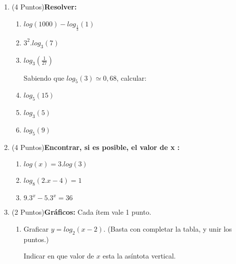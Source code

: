 \documentclass[a4paper,11pt,spanish,sans]{exam}
\begin{document}
\begin{enumerate}
\item (4 Puntos)\textbf{Resolver:} 
\begin{multicols}{2}
\begin{enumerate}
\item $log(1000)-log_{\frac{1}{3}}(1)$
\item $3^2.{log_3(7)}$
\item $log_3(\frac{1}{27})$

\columnbreak

Sabiendo que $log_5(3)\simeq 0,68$, calcular:

\item $log_5(15)$
\item $log_3(5)$
\item $log_5(9)$


\end{enumerate}
\end{multicols}



\item (4 Puntos)\textbf{Encontrar, si es posible, el valor de x :}
\begin{enumerate}
\item $log(x)=3.log(3)$
\item $log_8(2.x-4)=1$
\item $9.3^{x}-5.3^x=36$
\end{enumerate}

\item (2 Puntos)\textbf{Gráficos:}
Cada ítem vale 1 punto.
\begin{enumerate}

\item  Graficar $y=log_{2}(x-2)$. (Basta con completar la tabla, y unir los puntos.)

Indicar en que  valor de $x$ esta la asíntota vertical. 




\end{enumerate}
\end{enumerate}
\end{document}
